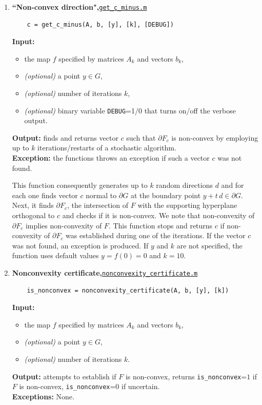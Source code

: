 \documentclass[a4paper]{article}
\theoremstyle{definition}
\begin{document}
\begin{enumerate}
\item {\bf ``Non-convex direction",\hskip 6pt}\underline{\tt  get\_c\_minus.m} 
	\begin{verbatim}
	c = get_c_minus(A, b, [y], [k], [DEBUG])
	\end{verbatim}
{\bf Input:}
\begin{itemize}
	\item the map $f$ specified by matrices $A_k$ and vectors $b_k$,
	\item {\it (optional)} a point $y\in G$,
	\item {\it (optional)} number of iterations $k$,
	\item {\it (optional)} binary variable {\tt DEBUG}=1/0 that turns on/off the verbose output.
\end{itemize}
{\bf Output:}  finds and returns vector $c$ such that $\partial F_c$ is non-convex by employing up to $k$ iterations/restarts of a stochastic algorithm.\\
{\bf Exception:} the functions throws an exception if such a vector $c$ was not found.

This function consequently generates up to $k$ random directions $d$ and for each one finds vector $c$ normal to $\partial G$ at the boundary point $y+t\, d\in \partial G$.
Next, it finds $\partial F_c$, the intersection of $F$ with the supporting hyperplane orthogonal to $c$ and checks if it is non-convex.
We note that non-convexity of $\partial F_c$ implies non-convexity of $F$.
This function stops and returns $c$ if non-convexity of $\partial F_c$ was established during one of the iterations. If the vector $c$ was not found, an exception is produced.
If $y$ and $k$ are not specified, the function uses default values $y=f(0)=0$ and $k=10$.


\item {\bf Nonconvexity certificate,\hskip 6pt}\underline{\tt  nonconvexity\_certificate.m} 
	\begin{verbatim}
	is_nonconvex = nonconvexity_certificate(A, b, [y], [k])
	\end{verbatim}
{\bf Input:}
\begin{itemize}
	\item the map $f$ specified by matrices $A_k$ and vectors $b_k$,
	\item {\it (optional)} a point $y\in G$,
	\item {\it (optional)} number of iterations $k$.
\end{itemize}
{\bf Output:} attempts to establish if $F$ is non-convex, returns {\tt is\_nonconvex}=$1$ if $F$ is non-convex,  {\tt is\_nonconvex}=$0$ if uncertain.\\
{\bf Exceptions:} None.


\end{enumerate}
\end{document}
